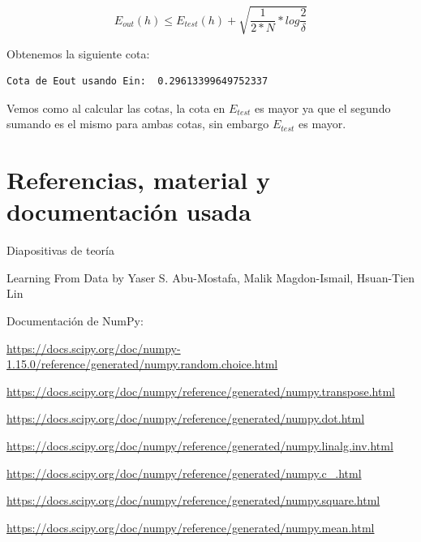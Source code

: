 \documentclass[12pt, spanish]{article}
\begin{document}
$$ E_{out}(h) \leq E_{test}(h) + \sqrt{\frac{1}{2*N}*log\frac{2}{\delta}} $$

Obtenemos la siguiente cota:

\begin{lstlisting}
Cota de Eout usando Ein:  0.29613399649752337
\end{lstlisting}

Vemos como al calcular las cotas, la cota en $E_{test}$ es mayor ya que el segundo sumando es el mismo para ambas cotas, sin embargo $E_{test}$ es mayor.

\newpage

\section{Referencias, material y documentación usada}


\begin{thebibliography}{9}

Diapositivas de teoría

Learning From Data by Yaser S. Abu-Mostafa, Malik Magdon-Ismail, Hsuan-Tien Lin

Documentación de NumPy:

\url{https://docs.scipy.org/doc/numpy-1.15.0/reference/generated/numpy.random.choice.html}

\url{https://docs.scipy.org/doc/numpy/reference/generated/numpy.transpose.html}

\url{https://docs.scipy.org/doc/numpy/reference/generated/numpy.dot.html}

\url{https://docs.scipy.org/doc/numpy/reference/generated/numpy.linalg.inv.html}

\url{https://docs.scipy.org/doc/numpy/reference/generated/numpy.c_.html}

\url{https://docs.scipy.org/doc/numpy/reference/generated/numpy.square.html}

\url{https://docs.scipy.org/doc/numpy/reference/generated/numpy.mean.html}


\end{thebibliography}
\end{document}
